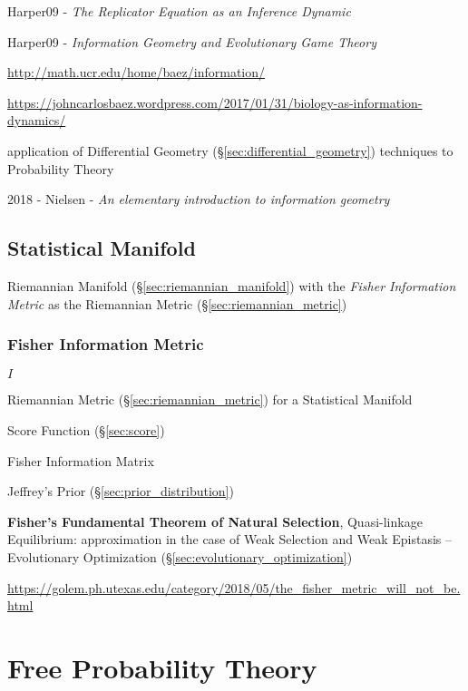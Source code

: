 Harper09 - \emph{The Replicator Equation as an Inference Dynamic}

Harper09 - \emph{Information Geometry and Evolutionary Game Theory}

\url{http://math.ucr.edu/home/baez/information/}

\url{https://johncarlosbaez.wordpress.com/2017/01/31/biology-as-information-dynamics/}

application of Differential Geometry
(\S\ref{sec:differential_geometry}) techniques to Probability Theory

2018 - Nielsen - \emph{An elementary introduction to information geometry}



\subsection{Statistical Manifold}\label{sec:statistical_manifold}

Riemannian Manifold (\S\ref{sec:riemannian_manifold}) with the
\emph{Fisher Information Metric} as the Riemannian Metric
(\S\ref{sec:riemannian_metric})



\subsubsection{Fisher Information Metric}\label{sec:fisher_metric}

$I$

Riemannian Metric (\S\ref{sec:riemannian_metric}) for a Statistical Manifold

Score Function (\S\ref{sec:score})

Fisher Information Matrix

Jeffrey's Prior (\S\ref{sec:prior_distribution})

\fist \textbf{Fisher's Fundamental Theorem of Natural Selection},
Quasi-linkage Equilibrium: approximation in the case of Weak Selection
and Weak Epistasis -- Evolutionary Optimization
(\S\ref{sec:evolutionary_optimization}) %

\url{https://golem.ph.utexas.edu/category/2018/05/the_fisher_metric_will_not_be.html}



\section{Free Probability Theory}\label{sec:free_probability}

